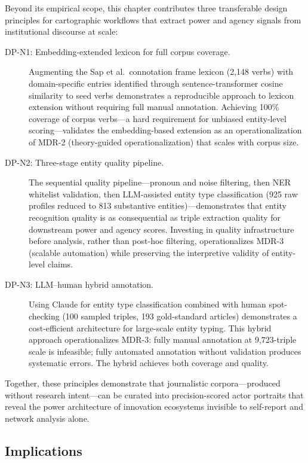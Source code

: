 \documentclass[../main.tex]{subfiles}
\begin{document}
Beyond its empirical scope, this chapter contributes three transferable design principles for cartographic workflows that extract power and agency signals from institutional discourse at scale:

\begin{description}
    \item[DP-N1: Embedding-extended lexicon for full corpus coverage.] Augmenting the Sap et al.\ connotation frame lexicon (2,148 verbs) with domain-specific entries identified through sentence-transformer cosine similarity to seed verbs demonstrates a reproducible approach to lexicon extension without requiring full manual annotation. Achieving 100\% coverage of corpus verbs---a hard requirement for unbiased entity-level scoring---validates the embedding-based extension as an operationalization of MDR-2 (theory-guided operationalization) that scales with corpus size.

    \item[DP-N2: Three-stage entity quality pipeline.] The sequential quality pipeline---pronoun and noise filtering, then NER whitelist validation, then LLM-assisted entity type classification (925 raw profiles reduced to 813 substantive entities)---demonstrates that entity recognition quality is as consequential as triple extraction quality for downstream power and agency scores. Investing in quality infrastructure before analysis, rather than post-hoc filtering, operationalizes MDR-3 (scalable automation) while preserving the interpretive validity of entity-level claims.

    \item[DP-N3: LLM--human hybrid annotation.] Using Claude for entity type classification combined with human spot-checking (100 sampled triples, 193 gold-standard articles) demonstrates a cost-efficient architecture for large-scale entity typing. This hybrid approach operationalizes MDR-3: fully manual annotation at 9,723-triple scale is infeasible; fully automated annotation without validation produces systematic errors. The hybrid achieves both coverage and quality.
\end{description}

Together, these principles demonstrate that journalistic corpora---produced without research intent---can be curated into precision-scored actor portraits that reveal the power architecture of innovation ecosystems invisible to self-report and network analysis alone.

\subsection{Implications}
\end{document}
